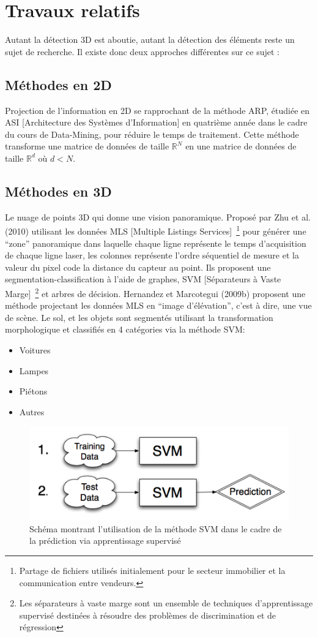 \chapter{Travaux relatifs}
Autant la détection 3D est aboutie, autant la détection des éléments reste un sujet de recherche. Il existe donc deux approches différentes sur ce sujet : 

\section{Méthodes en 2D}
Projection de l’information en 2D se rapprochant de la méthode ARP, étudiée en ASI [Architecture des Systèmes d'Information] en quatrième année dans le cadre du cours de Data-Mining, pour réduire le temps de traitement. Cette méthode transforme une matrice de données de taille $\mathbb{R}^{N}$ en une matrice de données de taille $\mathbb{R}^{d}$ où $d<N$.


\section{Méthodes en 3D}

Le nuage de points 3D qui donne une vision panoramique. Proposé par Zhu et al. (2010) utilisant les données MLS [Multiple Listings Services]~\footnote{Partage de fichiers utilisés initialement pour le secteur immobilier et la communication entre vendeurs.} pour générer une \enquote{zone} panoramique dans laquelle chaque ligne représente le temps d’acquisition de chaque ligne laser, les colonnes représente l’ordre séquentiel de mesure et la valeur du pixel code la distance du capteur au point. Ils proposent une segmentation-classification à l’aide de graphes, SVM [Séparateurs à Vaste Marge]~\footnote{Les séparateurs à vaste marge sont un ensemble de techniques d'apprentissage supervisé destinées à résoudre des problèmes de discrimination et de régression}
et arbres de décision. Hernandez et Marcotegui (2009b) proposent une méthode projectant les données MLS en \enquote{image d'élévation}, c’est à dire, une vue de scène. Le sol, et les objets sont segmentés utilisant la transformation morphologique et classifiés en 4 catégories via la méthode SVM:
\begin{itemize}
\item Voitures
\item Lampes
\item Piétons
\item Autres
\end{itemize}

\begin{figure}[H]
\centering
\includegraphics[width=0.5\linewidth]{./images/svm.png}
\caption{Schéma montrant l'utilisation de la méthode SVM dans le cadre de la prédiction via apprentissage supervisé}
\end{figure}